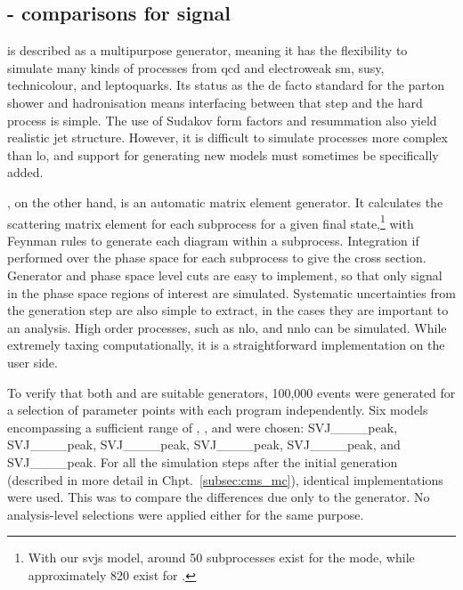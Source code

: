 

\subsection{\texorpdfstring{\PYTHIA}{Pythia}-\texorpdfstring{\MADGRAPH}{MadGraph} comparisons for \texorpdfstring{\schannel}{s-channel} signal}
\label{subsec:svj_schannel_comparisons}


\PYTHIAEIGHT is described as a multipurpose generator, meaning it has the flexibility to simulate many kinds of processes from \acrshort{qcd} and electroweak \acrshort{sm}, \acrshort{susy}, technicolour, and leptoquarks. Its status as the de facto standard for the parton shower and hadronisation means interfacing between that step and the hard process is simple. The use of Sudakov form factors and resummation also yield realistic jet structure. However, it is difficult to simulate processes more complex than \acrshort{lo}, and support for generating new models must sometimes be specifically added.

\MGvATNLO, on the other hand, is an automatic matrix element generator. It calculates the scattering matrix element for each subprocess for a given final state,\footnote{With our \glspl{svj} model, around 50 subprocesses exist for the \schannel mode, while approximately 820 exist for \tchannel.} with Feynman rules to generate each diagram within a subprocess. Integration if performed over the phase space for each subprocess to give the cross section. Generator and phase space level cuts are easy to implement, so that only signal in the phase space regions of interest are simulated. Systematic uncertainties from the generation step are also simple to extract, in the cases they are important to an analysis. High order processes, such as \acrshort{nlo}, and \acrshort{nnlo} can be simulated. While extremely taxing computationally, it is a straightforward implementation on the user side.

To verify that both \PYTHIA and \MADGRAPH are suitable generators, 100,000 events were generated for a selection of parameter points with each program independently. Six models encompassing a sufficient range of \mZprime, \mDark, and \rinv were chosen: SVJ\_\_\_\_\-peak, SVJ\_\_\_\_peak, SVJ\_\_\_\_\-peak, SVJ\_\_\_\_\-peak, SVJ\_\_\_\_\-peak, and SVJ\_\_\_\_\-peak. For all the simulation steps after the initial generation (described in more detail in Chpt.~\ref{subsec:cms_mc}), identical implementations were used. This was to compare the differences due only to the generator. No analysis-level selections were applied either for the same purpose.

